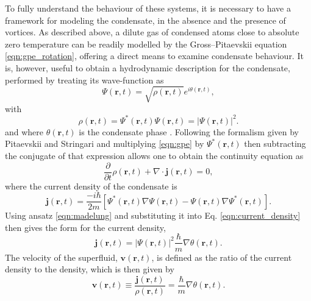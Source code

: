 To fully understand the behaviour of these systems, it is necessary to have a framework for modeling the condensate, in the absence and the presence of vortices. As described above, a dilute gas of condensed atoms close to absolute zero temperature can be readily modelled by the Gross--Pitaevskii equation \eqref{eqn:gpe_rotation}, offering a direct means to examine condensate behaviour. It is, however, useful to obtain a hydrodynamic description for the condensate, performed by treating its wave-function as
\begin{equation}\label{eqn:madelung}
\Psi(\textbf{r},t) = \sqrt{\rho(\mathbf{r},t)} e^{i\theta(\textbf{r},t)},
\end{equation}
with
\begin{equation}\label{eqn:density}
\rho(\textbf{r},t) = \Psi^*(\textbf{r},t)\Psi(\textbf{r},t) = \vert \Psi (\textbf{r},t) \vert ^2.
\end{equation}
and where $\theta(\textbf{r},t)$ is the condensate phase \cite[~chap. 1]{BK:Pitaevskii_Stringari_2003}. Following the formalism given by Pitaevskii and Stringari \cite{BK:Pitaevskii_Stringari_2003} and multiplying \eqref{eqn:gpe} by $\Psi^{*}(\mathbf{r},t)$ then subtracting the conjugate of that expression allows one to obtain the continuity equation as
\begin{equation}\label{eqn:continuity}
\frac{\partial}{\partial t}\rho(\textbf{r},t)  + \nabla\cdot \textbf{j}(\textbf{r},t) = 0,
\end{equation}
where the current density of the condensate is
\begin{equation}\label{eqn:current_density}
\textbf{j}(\textbf{r},t) = \frac{-i\hbar}{2m}\left[\Psi^*(\textbf{r},t)\nabla\Psi(\textbf{r},t) - \Psi(\textbf{r},t)\nabla\Psi^*(\textbf{r},t)\right].
\end{equation}
Using ansatz \eqref{eqn:madelung} and substituting it into Eq. \eqref{eqn:current_density} then gives the form for the current density,
\begin{equation}
\textbf{j}(\textbf{r},t) = \vert\Psi(\textbf{r},t)\vert ^2\frac{\hbar}{m}\nabla\theta(\textbf{r},t).
\end{equation}
The velocity of the superfluid, $\textbf{v}(\textbf{r},t)$, is defined as the ratio of the current density to the density, which is then given by
\begin{equation}\label{eqn:velocity}
\textbf{v}(\textbf{r},t)\equiv \frac{\textbf{j}(\textbf{r},t)}{\rho(\textbf{r},t)} = \frac{\hbar}{m}\nabla\theta(\textbf{r},t).
\end{equation}
